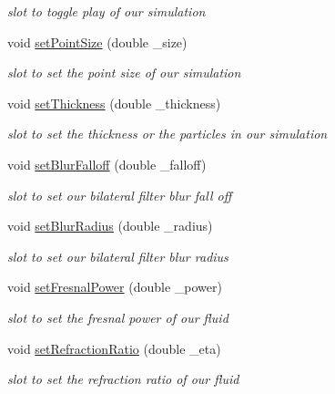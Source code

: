 \begin{DoxyCompactItemize}
\begin{DoxyCompactList}\small\item\em slot to toggle play of our simulation \end{DoxyCompactList}\item 
void \hyperlink{class_fluid_prop_dock_widget_afeb4fe68de9245e8fc3696870ed239b1}{set\-Point\-Size} (double \-\_\-size)
\begin{DoxyCompactList}\small\item\em slot to set the point size of our simulation \end{DoxyCompactList}\item 
void \hyperlink{class_fluid_prop_dock_widget_a350d3512b0f415f51ea121e6f1136028}{set\-Thickness} (double \-\_\-thickness)
\begin{DoxyCompactList}\small\item\em slot to set the thickness or the particles in our simulation \end{DoxyCompactList}\item 
void \hyperlink{class_fluid_prop_dock_widget_ae7b93e96ca395cbd0301ec297480ee04}{set\-Blur\-Falloff} (double \-\_\-falloff)
\begin{DoxyCompactList}\small\item\em slot to set our bilateral filter blur fall off \end{DoxyCompactList}\item 
void \hyperlink{class_fluid_prop_dock_widget_a2ae578e791a6768c99dc8e2e297ea4bb}{set\-Blur\-Radius} (double \-\_\-radius)
\begin{DoxyCompactList}\small\item\em slot to set our bilateral filter blur radius \end{DoxyCompactList}\item 
void \hyperlink{class_fluid_prop_dock_widget_a7993dd47f7e625c8b1a3f12def0d1d72}{set\-Fresnal\-Power} (double \-\_\-power)
\begin{DoxyCompactList}\small\item\em slot to set the fresnal power of our fluid \end{DoxyCompactList}\item 
void \hyperlink{class_fluid_prop_dock_widget_a2f07e4371b46ccbd7c649264e94646de}{set\-Refraction\-Ratio} (double \-\_\-eta)
\begin{DoxyCompactList}\small\item\em slot to set the refraction ratio of our fluid \end{DoxyCompactList}\item 

\end{DoxyCompactItemize}
